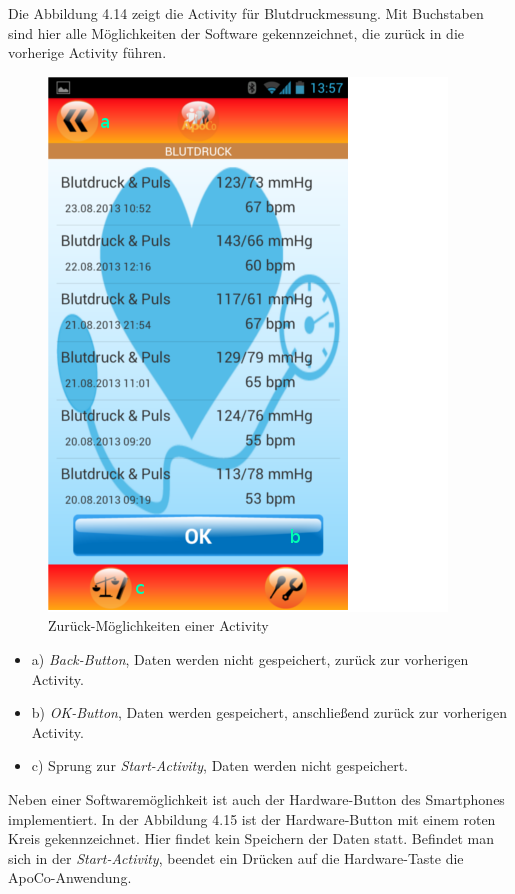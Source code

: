 Die Abbildung 4.14 zeigt die Activity f\"ur Blutdruckmessung.
Mit Buchstaben sind hier alle M\"oglichkeiten der Software gekennzeichnet, die zur\"uck in die vorherige Activity f\"uhren.\\


\begin{figure}[h]
  \centering
  \includegraphics[scale=0.5]{screenshots/kapitel4/gui/back_btns.png}
  \caption{Zur\"uck-M\"oglichkeiten einer Activity}
  
\end{figure}


\begin{itemize}
 \item a) \emph{Back-Button}, Daten werden nicht gespeichert, zur\"uck zur vorherigen Activity. 
 \item b) \emph{OK-Button}, Daten werden gespeichert, anschlie\ss{}end zur\"uck zur vorherigen Activity.
 \item c) Sprung zur \emph{Start-Activity}, Daten werden nicht gespeichert. 
\end{itemize}

Neben einer Softwarem\"oglichkeit ist auch der Hardware-Button des Smartphones implementiert.
In der Abbildung 4.15 ist der Hardware-Button mit einem roten Kreis gekennzeichnet.
Hier findet kein Speichern der Daten statt.
Befindet man sich in der \emph{Start-Activity}, beendet ein Dr\"ucken auf die Hardware-Taste die ApoCo-Anwendung.\\

